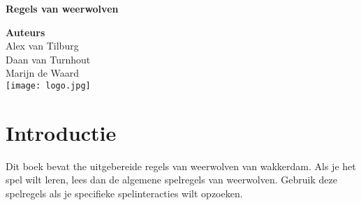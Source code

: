 \documentclass{article}
\begin{document}
\begin{titlepage}
    \begin{center}
        \Huge
        \textbf{Regels van weerwolven}

        \vspace{1cm}
        \textbf{Auteurs} \\
        \vspace{0.5cm}
        \Large
        Alex van Tilburg \\
        Daan van Turnhout \\
        Marijn de Waard \\

        \vfill
        \texttt{[image: logo.jpg]}
        \vfill
    \end{center}
\end{titlepage}

\sffamily

\section*{Introductie}
Dit boek bevat the uitgebereide regels van weerwolven van wakkerdam.
Als je het spel wilt leren, lees dan de algemene spelregels van weerwolven.
Gebruik deze spelregels als je specifieke spelinteracties wilt opzoeken.
\end{document}
